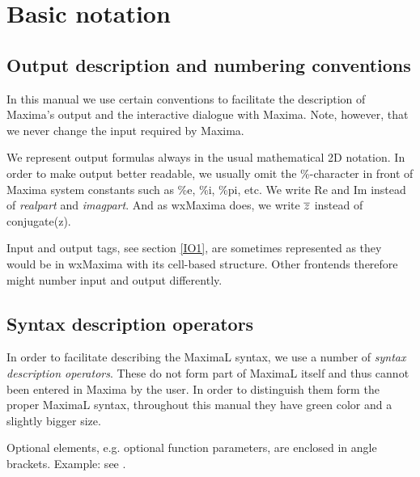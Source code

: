\documentclass[../Maxima_Workbook.tex]{subfiles}
\begin{document}
\section{Basic notation}

\subsection{Output description and numbering conventions}

In this manual we use certain conventions to facilitate the description of Maxima's output and the interactive dialogue with Maxima. Note, however, that we never change the input required by Maxima. 

\lz We represent output formulas always in the usual mathematical 2D notation. In order to make output better readable, we usually omit the \%-character in front of Maxima system constants such as \%e, \%i, \%pi, etc. We write Re and Im instead of \emph{realpart} and \emph{imagpart}. And as wxMaxima does, we write $ \overline{z} $ instead of conjugate(z). 

\lz Input and output tags, see section \ref{IO1}, are sometimes represented as they would be in wxMaxima with its cell-based structure. Other frontends therefore might number input and output differently.

\subsection{Syntax description operators}

In order to facilitate describing the MaximaL syntax, we use a number of \emph{syntax description operators}. These do not form part of MaximaL itself and thus cannot been entered in Maxima by the user. In order to distinguish them form the proper MaximaL syntax, throughout this manual they have green color and a slightly bigger size.

\lzz \tcr{\emph{$ \glangle \dots \grangle $}} \hfill {}\index{$ \glangle \grangle $}

\lz Optional elements, e.g. optional function parameters, are enclosed in angle brackets. Example: see .

\lzz \tcr{\emph{$ \gpal \dots \gbar \dots \gpar $}} \hfill {}\index{$ \gpal \gbar \gpar $}
\end{document}
